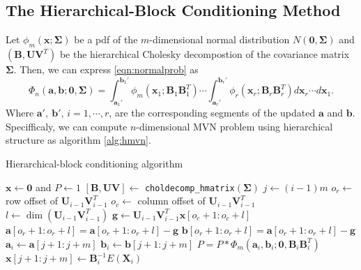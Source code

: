 \subsection{The Hierarchical-Block Conditioning Method}

Let $\phi_m(\mathbf{x}; \boldsymbol{\Sigma})$ be a pdf of the $m$-dimensional normal distribution $N(\mathbf{0}, \boldsymbol{\Sigma})$ and $(\mathbf{B}, \mathbf{U}\mathbf{V}^T)$ be the hierarchical Cholesky decompostion of the covariance matrix $\boldsymbol{\Sigma}$. Then, we can express \eqref{eqn:normalprob} as 
\begin{equation}\label{eqn:hmvn}
    \Phi_n(\mathbf{a}, \mathbf{b}; \mathbf{0}, \boldsymbol{\Sigma}) 
    = \int_{\mathbf{a}_1'}^{\mathbf{b}_1'} \phi_m(\mathbf{x}_1; \mathbf{B}_1\mathbf{B}_1^T) 
    \cdots 
    \int_{\mathbf{a}_r'}^{\mathbf{b}_r'} \phi_r(\mathbf{x}_r; \mathbf{B}_r\mathbf{B}_r^T) d\mathbf{x}_r \cdots d\mathbf{x}_1.
\end{equation}
Where $\mathbf{a}',~\mathbf{b}'$, $i=1,\cdots,r$, are the corresponding segments of the updated $\mathbf{a}$ and $\mathbf{b}$. Specifficaly, we can compute $n$-dimensional MVN problem using hierarchical structure as algorithm \ref{alg:hmvn}.

\begin{algorithm}[ht]
    \caption{Hierarchical-block conditioning algorithm}
    \begin{algorithmic}[1]
    
        \State $\mathbf{x} \leftarrow \mathbf{0}$ and $P \leftarrow 1$
        \State $[\mathbf{B}, \mathbf{UV}] \leftarrow$ \texttt{choldecomp\_hmatrix}$(\boldsymbol{\Sigma})$
            \State $j \leftarrow (i-1)m$
                \State $o_r \leftarrow$ row offset of $\mathbf{U}_{i-1}\mathbf{V}_{i-1}^T$
                \State $o_c \leftarrow$ column offset of $\mathbf{U}_{i-1}\mathbf{V}_{i-1}^T$
                \State $l \leftarrow \dim(\mathbf{U}_{i-1}\mathbf{V}_{i-1}^T)$
                \State $\mathbf{g} \leftarrow \mathbf{U}_{i-1}\mathbf{V}_{i-1}^T\mathbf{x}[o_c+1:o_c+l]$
                \State $\mathbf{a}[o_r+1:o_r+l] = \mathbf{a}[o_r+1:o_r+l] - \mathbf{g}$
                \State $\mathbf{b}[o_r+1:o_r+l] = \mathbf{a}[o_r+1:o_r+l] - \mathbf{g}$
            \EndIf
            \State $\mathbf{a}_i \leftarrow \mathbf{a}[j+1:j+m]$
            \State $\mathbf{b}_i \leftarrow \mathbf{b}[j+1:j+m]$
            \State $P = P*\Phi_m(\mathbf{a}_i, \mathbf{b}_i; \mathbf{0}, \mathbf{B}_i\mathbf{B}_i^T)$
            \State $\mathbf{x}[j+1:j+m] \leftarrow \mathbf{B}_{i}^{-1} E(\mathbf{X}_i)$
        \EndFor
    \EndProcedure

    \end{algorithmic}\label{alg:hmvn}
\end{algorithm}

